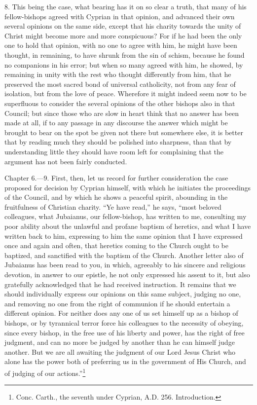 8. This being the case, what bearing has it on so clear a truth, that many of his fellow-bishops agreed with Cyprian in that opinion, and advanced their own several opinions on the same side, except that his charity towards the unity of Christ might become more and more conspicuous? For if he had been the only one to hold that opinion, with no one to agree with him, he might have been thought, in remaining, to have shrunk from the sin of schism, because he found no companions in his error; but when so many agreed with him, he showed, by remaining in unity with the rest who thought differently from him, that he preserved the most sacred bond of universal catholicity, not from any fear of isolation, but from the love of peace. Wherefore it might indeed seem now to be superfluous to consider the several opinions of the other bishops also in that Council; but since those who are slow in heart think that no answer has been made at all, if to any passage in any discourse the answer which might be brought to bear on the spot be given not there but somewhere else, it is better that by reading much they should be polished into sharpness, than that by understanding little they should have room left for complaining that the argument has not been fairly conducted.


Chapter 6.—9. First, then, let us record for further consideration the case proposed for decision by Cyprian himself, with which he initiates the proceedings of the Council, and by which he shows a peaceful spirit, abounding in the fruitfulness of Christian charity. ``Ye have read,'' he says, ``most beloved colleagues, what Jubaianus, our fellow-bishop, has written to me, consulting my poor ability about the unlawful and profane baptism of heretics, and what I have written back to him, expressing to him the same opinion that I have expressed once and again and often, that heretics coming to the Church ought to be baptized, and sanctified with the baptism of the Church. Another letter also of Jubaianus has been read to you, in which, agreeably to his sincere and religious devotion, in answer to our epistle, he not only expressed his assent to it, but also gratefully acknowledged that he had received instruction. It remains that we should individually express our opinions on this same subject, judging no one, and removing no one from the right of communion if he should entertain a different opinion. For neither does any one of us set himself up as a bishop of bishops, or by tyrannical terror force his colleagues to the necessity of obeying, since every bishop, in the free use of his liberty and power, has the right of free judgment, and can no more be judged by another than he can himself judge another. But we are all awaiting the judgment of our Lord Jesus Christ who alone has the power both of preferring us in the government of His Church, and of judging of our actions.''\footnote{\par  Conc. Carth., the seventh under Cyprian, A.D. 256. Introduction.}

